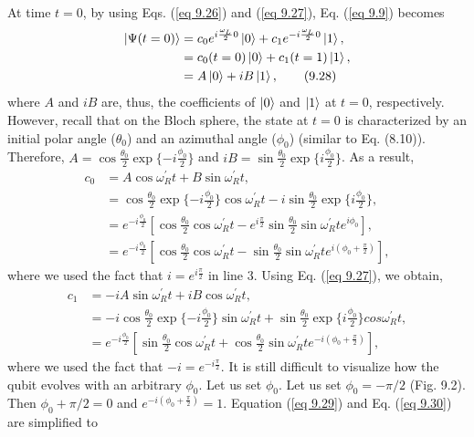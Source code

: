 \documentclass{article}
\begin{document}
At time $t=0$, by using Eqs. (\ref{eq 9.26}) and (\ref{eq 9.27}), Eq. (\ref{eq 9.9}) becomes
\begin{align*}\label{eq 9.28}
    \ket{\Psi(t=0)}&=c_0e^{i\frac{\omega_L}{2}0}\ket{0}+c_1e^{-i\frac{\omega_L}{2}0}\ket{1},\\
    &=c_0(t=0)\ket{0}+c_1(t=1)\ket{1},\\
    &=A\ket{0}+iB\ket{1}, \tag{9.28}
\end{align*}
where $A$ and $iB$ are, thus, the coefficients of $\ket{0}$ and $\ket{1}$ at $t=0$, respectively. However, recall that on the Bloch sphere,
the state at $t=0$ is characterized by an initial polar angle ($\theta_0$) and an azimuthal angle ($\phi_0$) (similar to Eq. (8.10)). Therefore,
$A=\cos\frac{\theta_0}{2}\exp\{ -i{\frac{\phi_0}{2}}\}$ and $iB=\sin\frac{\theta_0}{2}\exp\{ i{\frac{\phi_0}{2}}\}$. As a result,
\begin{align*}\label{eq 9.29}
    c_0&=A\cos\omega_R^\prime t+B\sin\omega_R^\prime t,\\
    &=\cos\frac{\theta_0}{2}\exp\{ -i{\frac{\phi_0}{2}}\}\cos\omega_R^\prime t -i\sin{\frac{\theta_0}{2}}\exp\{ i{\frac{\phi_0}{2}}\},\\
    &=e^{-i\frac{\phi_0}{2}}[\cos{\frac{\theta_0}{2}}\cos\omega_R^\prime t-e^{i\frac{\pi}{2}}\sin{\frac{\theta_0}{2}}\sin\omega_R^\prime te^{i\phi_0}],\\
    &=e^{-i\frac{\phi_0}{2}}[\cos{\frac{\theta_0}{2}}\cos\omega_R^\prime t- \sin{\frac{\theta_0}{2}}\sin\omega_R^\prime te^{i(\phi_0+\frac{\pi}{2})}],\tag{9.29}
\end{align*}
where we used the fact that $i=e^{i\frac{\pi}{2}}$ in line 3. Using Eq. (\ref{eq 9.27}), we obtain,
\begin{align*}\label{eq 9.30}
    c_1&=-iA\sin\omega_R^\prime t+iB\cos\omega_R^\prime t,\\
    &= -i\cos{\frac{\theta_0}{2}}\exp\{ -i{\frac{\phi_0}{2}}\}\sin\omega_R^\prime t+\sin{\frac{\theta_0}{2}}\exp\{ i{\frac{\phi_0}{2}}\}cos\omega_R^\prime t,\\
    &=e^{-i\frac{\phi_0}{2}}[\sin{\frac{\theta_0}{2}}\cos\omega_R^\prime t+ \cos{\frac{\theta_0}{2}}\sin\omega_R^\prime te^{-i(\phi_0+\frac{\pi}{2})}],\tag{9.30}
\end{align*}
where we used the fact that $-i=e^{-i\frac{\pi}{2}}$. It is still difficult to visualize how the qubit evolves with an arbitrary
$\phi_0$. Let us set $\phi_0$. Let us set $\phi_0=-\pi/2$ (Fig. 9.2). Then $\phi_0+\pi/2=0$ and $e^{-i(\phi_0+\frac{\pi}{2})}=1$.
Equation (\ref{eq 9.29}) and Eq. (\ref{eq 9.30}) are simplified to
\end{document}
